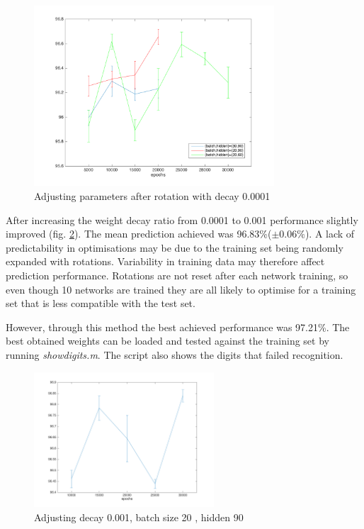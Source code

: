 \documentclass[11]{article}
\begin{document}
\begin{figure}[h]
\centering
\includegraphics[width=0.8\textwidth]{rotations.png}
\caption{Adjusting parameters after rotation with decay 0.0001}
\label{fig:rotations}
\end{figure}

After increasing the weight decay ratio from 0.0001 to 0.001 performance slightly improved (fig. \ref{fig:rotations2}). The mean prediction achieved was 96.83\%($\pm 0.06\%$). A lack of predictability in optimisations may be due to the training set being randomly expanded with rotations. Variability in training data may therefore affect prediction performance. Rotations are not reset after each network training, so even though 10 networks are trained they are all likely to optimise for a training set that is less compatible with the test set. 

However, through this method the best achieved performance was 97.21\%. The best obtained weights can be loaded and tested against the training set by running \emph{showdigits.m}. The script also shows the digits that failed recognition. 

\begin{figure}[h]
\centering
\includegraphics[width=0.6\textwidth]{rotations2.png}
\caption{Adjusting decay 0.001, batch size 20 , hidden 90}
\label{fig:rotations2}
\end{figure}
\end{document}

